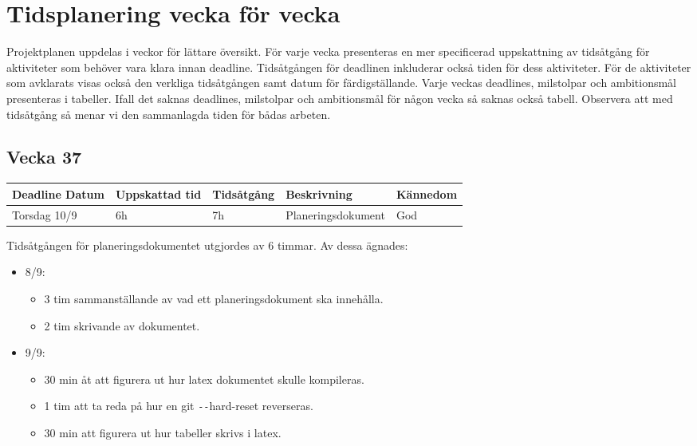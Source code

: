 \documentclass{TDP003mall}
\begin{document}
\section{Tidsplanering vecka för vecka}
Projektplanen uppdelas i veckor för lättare översikt. För varje vecka presenteras
 en mer specificerad uppskattning av tidsåtgång för aktiviteter som behöver vara
 klara innan deadline. Tidsåtgången för deadlinen inkluderar också tiden för dess
 aktiviteter. För de aktiviteter som avklarats visas också den verkliga tidsåtgången
 samt datum för färdigställande. Varje veckas deadlines, milstolpar och ambitionsmål presenteras
 i tabeller. Ifall det saknas deadlines, milstolpar och ambitionsmål för någon vecka så saknas också
 tabell. Observera att med tidsåtgång så menar vi den sammanlagda tiden för bådas arbeten.

\subsection{Vecka 37}
\begin{tabularx}{\linewidth}{|l|l|l|X|l|}
	\hline
	Deadline Datum & Uppskattad tid & Tidsåtgång & Beskrivning        & Kännedom \\ [0.5ex]
	\hline
	Torsdag 10/9   & 6h             & 7h         & Planeringsdokument & God      \\
	\hline
\end{tabularx}{\linewidth}

Tidsåtgången för planeringsdokumentet utgjordes av 6 timmar. Av dessa ägnades:
\begin{itemize}
	\item 8/9:
	\begin{itemize}
		\item 3 tim sammanställande av vad ett planeringsdokument ska innehålla.
		\item 2 tim skrivande av dokumentet.
	\end{itemize}
	\item 9/9:
	\begin{itemize}
		\item 30 min åt att figurera ut hur latex dokumentet skulle kompileras.
		\item 1 tim att ta reda på hur en git \texttt{-{}-}hard-reset reverseras.
		\item 30 min att figurera ut hur tabeller skrivs i latex.\\
	\end{itemize}
\end{itemize}
\end{document}
